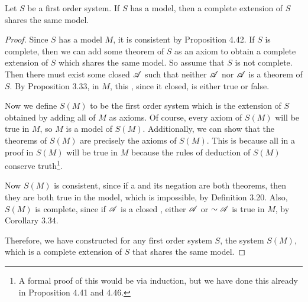 \begin{proposition*}
  Let \(S\) be a first order system. If \(S\) has a model, then a complete extension of \(S\) shares the same model.

  \begin{proof}
    Since \(S\) has a model \(M\), it is consistent by Proposition 4.42. If \(S\) is complete, then we can add some theorem of \(S\) as an axiom to obtain a complete extension of \(S\) which shares the same model. So assume that \(S\) is not complete. Then there must exist some closed \wf{} \(\mathscr{A}\) such that neither \(\mathscr{A}\) nor \(\mathscr{A}\) is a theorem of \(S\). By Proposition 3.33, in \(M\), this \wf{}, since it closed, is either true or false.

    Now we define \(S(M)\) to be the first order system which is the extension of \(S\) obtained by adding all \wfs{} of \(M\) as axioms. Of course, every axiom of \(S(M)\) will be true in \(M\), so \(M\) is a model of \(S(M)\). Additionally, we can show that the theorems of \(S(M)\) are precisely the axioms of \(S(M)\). This is because all \wfs{} in a proof in \(S(M)\) will be true in \(M\) because the rules of deduction of \(S(M)\) conserve truth\footnote{A formal proof of this would be via induction, but we have done this already in Proposition 4.41 and 4.46.}.

    Now \(S(M)\) is consistent, since if a \wf{} and its negation are both theorems, then they are both true in the model, which is impossible, by Definition 3.20. Also, \(S(M)\) is complete, since if \(\mathscr{A}\) is a closed \wf{}, either \(\mathscr{A}\) or \(\sim\mathscr{A}\) is true in \(M\), by Corollary 3.34.

    Therefore, we have constructed for any first order system \(S\), the system \(S(M)\), which is a complete extension of \(S\) that shares the same model.
  \end{proof}
\end{proposition*}

